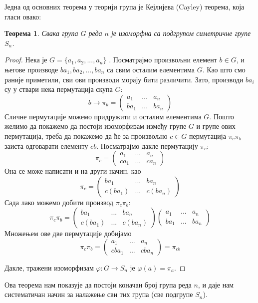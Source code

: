 \documentclass{report}
\theoremstyle{plain}
\newtheorem{thm}{Теорема}
\theoremstyle{definition}
\begin{document}
Једна од основних теорема у теорији група је Кејлијева (Cayley) теорема, која гласи овако:
\begin{thm}
Свака група $G$ реда $n$ је изоморфна са подгрупом симетричне групе $S_n$.
\end{thm}
\begin{proof}
Нека је $G = \{a_1, a_2, ..., a_n\}$ . Посматрајмо произвољни елемент $b\in G$, и његове производе $ba_1, ba_2, ..., ba_n$ са свим осталим елементима $G$. Као што смо раније приметили, сви ови производи морају бити различити. Зато, производи $ba_i$ су у ствари нека пермутација скупа $G$:
$$b\to \pi_b = \begin{pmatrix}
                a_1 & ... & a_n \\
                ba_1 & ... & ba_n
               \end{pmatrix}$$
Сличне пермутације можемо придружити и осталим елементима $G$. Пошто желимо да покажемо да постоји изоморфизам између групе $G$ и групе ових пермутација, треба да покажемо да ће за произвољно $c\in G$ пермутација $\pi_c \pi_b$ заиста одговарати елементу $cb$. Посматрајмо дакле пермутацију $\pi_c$:
$$\pi_c = \begin{pmatrix}
                a_1 & ... & a_n \\
                ca_1 & ... & ca_n
          \end{pmatrix}$$
Она се може написати и на други начин, као
$$\pi_c = \begin{pmatrix}
                ba_1 & ... & ba_n \\
                c(ba_1) & ... & c(ba_n)
          \end{pmatrix}$$
Сада лако можемо добити производ $\pi_c \pi_b$:
$$\pi_c \pi_b= \begin{pmatrix}
                ba_1 & ... & ba_n \\
                c(ba_1) & ... & c(ba_n)
               \end{pmatrix}
               \begin{pmatrix}
                a_1 & ... & a_n \\
                ba_1 & ... & ba_n
               \end{pmatrix}$$
Множењем ове две пермутације добијамо
$$\pi_c \pi_b= \begin{pmatrix}
                a_1 & ... & a_n \\
                cba_1 & ... & cba_n
               \end{pmatrix} = \pi_{cb}$$

Дакле, тражени изоморфизам $\varphi: G\to S_n$ је $\varphi(a) = \pi_a$.
\end{proof}
Ова теорема нам показује да постоји коначан број група реда $n$, и даје нам систематичан начин за налажење сви тих група (све подгрупе $S_n$).
\end{document}
